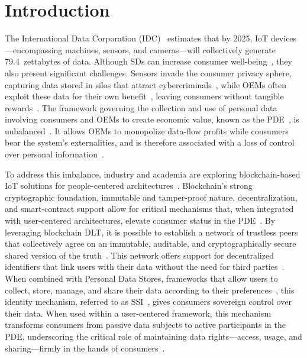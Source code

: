 \chapter{Introduction}
\label{ch:introduction}

\noindent The International Data Corporation (IDC)~\cite{idc:2021} estimates that by 2025, \ac{IoT} devices---encompassing machines, sensors, and cameras---will collectively generate 79.4~zettabytes of data.
Although \acp{SD} can increase consumer well-being~\cite{lee:lee:2020}, they also present significant challenges.
Sensors invade the consumer privacy sphere, capturing data stored in silos that attract cybercriminals~\cite{weber:2010}, while \acp{OEM} often exploit these data for their own benefit~\cite{zuboff:2019}, leaving consumers without tangible rewards~\cite{spiekermann:korunovska:2017}.
The framework governing the collection and use of personal data involving consumers and \acp{OEM} to create economic value, known as the \ac{PDE}~\cite{world:economic:forum:2011}, is unbalanced~\cite{ctrl:shift:2014}.
It allows \acp{OEM} to monopolize data-flow profits while consumers bear the system's externalities, and is therefore associated with a loss of control over personal information~\cite{abiteboul:andre:abiteboul:2015}.

To address this imbalance, industry and academia are exploring blockchain-based \ac{IoT} solutions for people-centered architectures~\cite{samaniego:deters:2017}.
Blockchain's strong cryptographic foundation, immutable and tamper-proof nature, decentralization, and smart-contract support allow for critical mechanisms that, when integrated with user-centered architectures, elevate consumer status in the \ac{PDE}~\cite{zyskind:nathan:pentland:2015}.
By leveraging blockchain \ac{DLT}, it is possible to establish a network of trustless peers that collectively agree on an immutable, auditable, and cryptographically secure shared version of the truth~\cite{zheng:xie:dai:chen:wang:2018}.
This network offers support for decentralized identifiers that link users with their data without the need for third parties~\cite{muhle:suhr:zanker:meinel:2018}.
When combined with Personal Data Stores, frameworks that allow users to collect, store, manage, and share their data according to their preferences~\cite{deangelis:pieri:2019}, this identity mechanism, referred to as \ac{SSI}~\cite{preukschat:reed:2021}, gives consumers sovereign control over their data.
When used within a user-centered framework, this mechanism transforms consumers from passive data subjects to active participants in the \ac{PDE}, underscoring the critical role of maintaining data rights---access, usage, and sharing---firmly in the hands of consumers~\cite{janssen:brous:estevez:barbosa:2018}.

